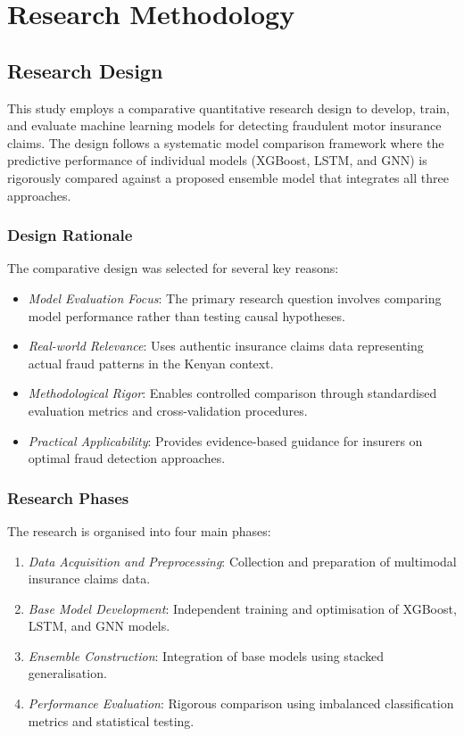 \documentclass[12pt,a4paper,oneside]{report}
\numberwithin{equation}{chapter}
\begin{document}
\chapter{Research Methodology}

\section{Research Design}

This study employs a comparative quantitative research design to develop, train, and evaluate
machine learning models for detecting fraudulent motor insurance claims. The design follows a
systematic model comparison framework where the predictive performance of individual models
(XGBoost, LSTM, and GNN) is rigorously compared against a proposed ensemble model that integrates
all three approaches.

\subsection{Design Rationale}

The comparative design was selected for several key reasons:
\begin{itemize}
    \item \textit{Model Evaluation Focus}: The primary research question involves comparing model performance rather than testing causal hypotheses.
    \item \textit{Real-world Relevance}: Uses authentic insurance claims data representing actual fraud patterns in the Kenyan context.
    \item \textit{Methodological Rigor}: Enables controlled comparison through standardised evaluation metrics and cross-validation procedures.
    \item \textit{Practical Applicability}: Provides evidence-based guidance for insurers on optimal fraud detection approaches.
\end{itemize}

\subsection{Research Phases}

The research is organised into four main phases:
\begin{enumerate}
    \item \textit{Data Acquisition and Preprocessing}: Collection and preparation of multimodal insurance claims data.
    \item \textit{Base Model Development}: Independent training and optimisation of XGBoost, LSTM, and GNN models.
    \item \textit{Ensemble Construction}: Integration of base models using stacked generalisation.
    \item \textit{Performance Evaluation}: Rigorous comparison using imbalanced classification metrics and statistical testing.
\end{enumerate}
\end{document}
